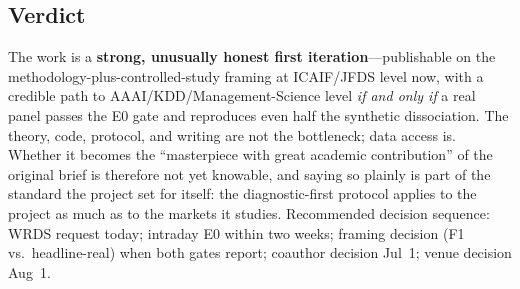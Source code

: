 \documentclass[11pt]{article}
\begin{document}
\subsection{Verdict}
The work is a \textbf{strong, unusually honest first iteration}---publishable on the
methodology-plus-controlled-study framing at ICAIF/JFDS level now, with a credible
path to AAAI/KDD/Management-Science level \emph{if and only if} a real panel passes
the E0 gate and reproduces even half the synthetic dissociation. The theory, code,
protocol, and writing are not the bottleneck; data access is. Whether it becomes the
``masterpiece with great academic contribution'' of the original brief is therefore
not yet knowable, and saying so plainly is part of the standard the project set for
itself: the diagnostic-first protocol applies to the project as much as to the
markets it studies. Recommended decision sequence: WRDS request today; intraday E0
within two weeks; framing decision (F1 vs.\ headline-real) when both gates report;
coauthor decision Jul~1; venue decision Aug~1.
\end{document}
